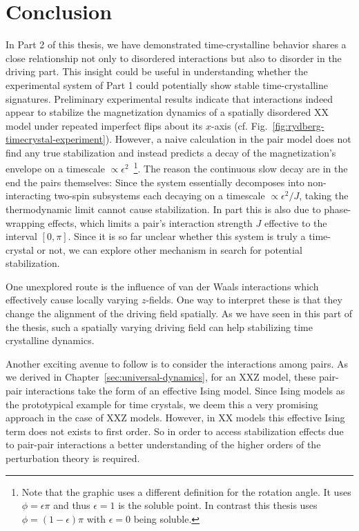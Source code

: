 \chapter{Conclusion}\label{ch:floquet-discussion}



In Part 2 of this thesis, we have demonstrated time-crystalline behavior shares a close relationship not only to disordered interactions but also to disorder in the driving part.  This insight could be useful in understanding whether the experimental system of Part 1 could potentially show stable time-crystalline signatures. Preliminary experimental results indicate that interactions indeed appear to stabilize the magnetization dynamics of a spatially disordered XX model under repeated imperfect flips about its $x$-axis (cf. Fig.~\ref{fig:rydberg-timecrystal-experiment}). However, a naive calculation in the pair model does not find any true stabilization and instead predicts a decay of the magnetization's envelope on a timescale $\propto\epsilon^2$~\footnote{Note that the graphic uses a different definition for the rotation angle. It uses $\phi=\epsilon \pi$ and thus $\epsilon = 1$ is the soluble point. In contrast this thesis uses $\phi=(1-\epsilon)\pi$ with $\epsilon=0$ being soluble.}. The reason the continuous slow decay are in the end the pairs themselves: Since the system essentially decomposes into non-interacting two-spin subsystems each decaying on a timescale $\propto \epsilon^2/J$, taking the thermodynamic limit cannot cause stabilization. In part this is also due to phase-wrapping effects, which limits a pair's interaction strength $J$ effective to the interval $[0,\pi]$. Since it is so far unclear whether this system is truly a time-crystal or not, we can explore other mechanism in search for potential stabilization. 

One unexplored route is the influence of van der Waals interactions which effectively cause locally varying $z$-fields. One way to interpret these is that they change the alignment of the driving field spatially. As we have seen in this part of the thesis, such a spatially varying driving field can help stabilizing time crystalline dynamics.

Another exciting avenue to follow is to consider the interactions among pairs. As we derived in Chapter~\ref{sec:universal-dynamics}, for an XXZ model, these pair-pair interactions take the form of an effective Ising model. Since Ising models as the prototypical example for time crystals, we deem this a very promising approach in the case of XXZ models. However, in XX models this effective Ising term does not exists to first order. So in order to access stabilization effects due to pair-pair interactions a better understanding of the higher orders of the perturbation theory is required.



